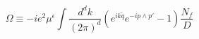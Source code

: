 \begin{equation}
\Omega\equiv -ie^{2}\mu^{\epsilon}\int
\frac{d^{d}k}{(2\pi)^{d}}\left(e^{ik\widetilde{q}}e^{-ip\wedge
p'}-1\right)\frac{\textit{N}_{f}}{\textit{D}}
\end{equation}

